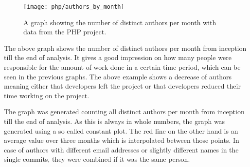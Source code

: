 \begin{figure}[h!t]
  \centering
  \texttt{[image: php/authors\_by\_month]}
  \caption[The Authors by Month Graph]
  {A graph showing the number of distinct authors per month with data from the
    PHP project.}
\end{figure}

The above graph shows the number of distinct authors per month from inception
till the end of analysis. It gives a good impression on how many people were
responsible for the amount of work done in a certain time period, which can be
seen in the previous graphs. The above example shows a decrease of authors
meaning either that developers left the project or that developers reduced
their time working on the project.

The graph was generated counting all distinct authors per month from inception
till the end of analysis. As this is always in whole numbers, the graph was
generated using a so called constant plot. The red line on the other hand is an
average value over three months which is interpolated between those points. In
case of authors with different email addresses or slightly different names in
the single commits, they were combined if it was the same person.



